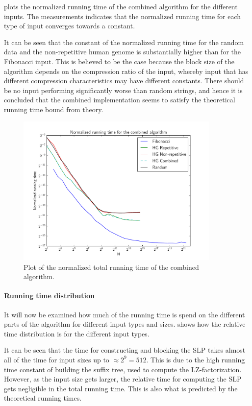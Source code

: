 \documentclass[twoside,11pt,openright]{report}
\begin{document}
 plots the normalized running time of the combined algorithm for the different inputs. The measurements indicates that the normalized running time for each type of input converges towards a constant.

It can be seen that the constant of the normalized running time for the random data and the non-repetitive human genome is substantially higher than for the Fibonacci input. This is believed to be the case because the block size of the algorithm depends on the compression ratio of the input, whereby input that has different compression characteristics may have different constants. There should be no input performing significantly worse than random strings, and hence it is concluded that the combined implementation seems to satisfy the theoretical running time bound from theory.
\begin{figure}[h!]
  \centering
  \includegraphics[width=10cm]{combined/total_runningtime}
  \caption{Plot of the normalized total running time of the combined algorithm.}
  \label{fig:benchmark:total-time-combined}
\end{figure}

\paragraph{Running time distribution}
It will now be examined how much of the running time is spend on the different parts of the algorithm for different input types and sizes.  shows how the relative time distribution is for the different input types.

It can be seen that the time for constructing and blocking the SLP takes almost all of the time for input sizes up to $\approx 2^9 = 512$. This is due to the high running time constant of building the suffix tree, used to compute the LZ-factorization. However, as the input size gets larger, the relative time for computing the SLP gets negligible in the total running time. This is also what is predicted by the theoretical running times.
\end{document}
